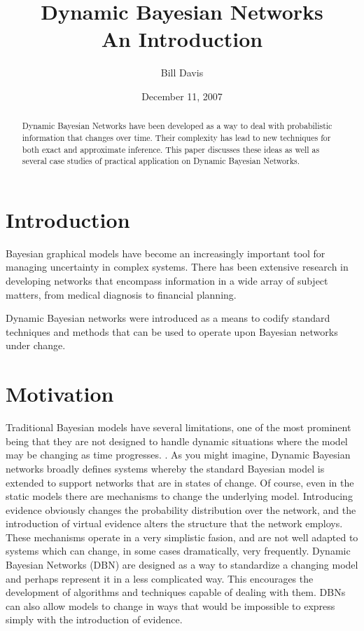 \documentclass{article}
\title{Dynamic Bayesian Networks\\An Introduction}
\author{Bill Davis}
\date{December 11, 2007}
\begin{document}
\maketitle

\begin{abstract}
Dynamic Bayesian Networks have been developed as a way to deal with probabilistic information that changes over time. Their complexity has lead to new techniques for both exact and approximate inference. This paper discusses these ideas as well as several case studies of practical application on Dynamic Bayesian Networks. 
\end{abstract}


\tableofcontents

\pagebreak

\section{Introduction}
Bayesian graphical models have become an increasingly important tool for managing uncertainty in complex systems. There has been extensive research in developing networks that encompass information in a wide array of subject matters, from medical diagnosis to financial planning.

Dynamic Bayesian networks were introduced as a means to codify standard techniques and methods that can be used to operate upon Bayesian networks under change. 

\section{Motivation}
Traditional Bayesian models have several limitations, one of the most prominent being that they are not designed to handle dynamic situations where the model may be changing as time progresses. \cite{mihajlovic2001}. As you might imagine, Dynamic Bayesian networks broadly defines systems whereby the standard Bayesian model is extended to support networks that are in states of change. Of course, even in the static models there are mechanisms to change the underlying model. Introducing evidence obviously changes the probability distribution over the network, and the introduction of virtual evidence alters the structure that the network employs. These mechanisms operate in a very simplistic fasion, and are not well adapted to systems which can change, in some cases dramatically, very frequently. Dynamic Bayesian Networks (DBN) are designed as a way to standardize a changing model and perhaps represent it in a less complicated way. This encourages the development of algorithms and techniques capable of dealing with them. DBNs can also allow models to change in ways that would be impossible to express simply with the introduction of evidence.
\end{document}
